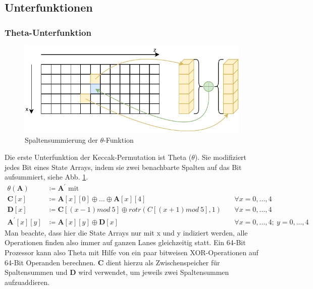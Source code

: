 \subsection{Unterfunktionen}
\label{cha:sha3_unterfunktionen}

\subsubsection{Theta-Unterfunktion}
\begin{figure}
    \center
    \includegraphics{images/theta.pdf}
    \caption{Spaltensummierung der $\theta$-Funktion}
    \label{fig:definition_theta}
\end{figure}
Die erste Unterfunktion der Keccak-Permutation ist Theta ($\theta$). Sie modifiziert jedes Bit eines State Arrays, indem sie zwei benachbarte Spalten auf das Bit aufsummiert, siehe Abb. \ref{fig:definition_theta}.
\begin{align*}
    \theta (\textbf{A}) & \coloneq \textbf{A}^\prime \text{ mit } \\
    \textbf{C}[x] & \coloneq \textbf{A}[x][0] \oplus ... \oplus \textbf{A}[x][4] && \forall x = 0,...,4 \\
    \textbf{D}[x] & \coloneq \textbf{C}[(x - 1) mod\ 5] \oplus rotr(C[(x + 1) mod\ 5], 1)\ && \forall x = 0,...,4 \\
    \textbf{A}^\prime[x][y] & \coloneq \textbf{A}[x][y] \oplus \textbf{D}[x]\ && \forall x = 0,...,4;\ y = 0,...,4
\end{align*}
Man beachte, dass hier die State Arrays nur mit x und y indiziert werden, alle Operationen finden also immer auf ganzen Lanes gleichzeitig statt.
Ein 64-Bit Prozessor kann also Theta mit Hilfe von ein paar bitweisen XOR-Operationen auf 64-Bit Operanden berechnen.
\textbf{C} dient hierzu als Zwischenspeicher für Spaltensummen und \textbf{D} wird verwendet, um jeweils zwei Spaltensummen aufzuaddieren.

